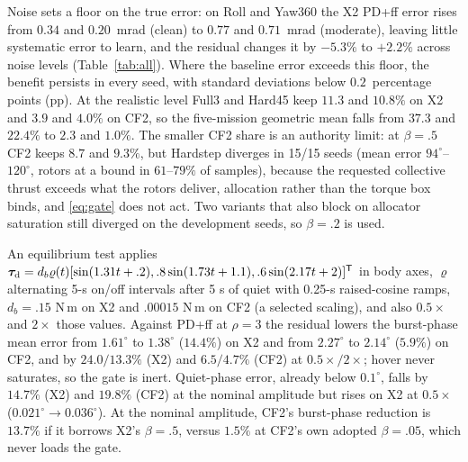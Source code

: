 \documentclass[letterpaper, 10 pt, conference]{ieeeconf}
\newcommand{\T}{^{\mathsf T}}
\begin{document}
Noise sets a floor on the true error: on Roll and Yaw360 the X2 PD+ff error rises from $0.34$ and $0.20$~mrad (clean) to $0.77$ and $0.71$~mrad (moderate), leaving little systematic error to learn, and the residual changes it by $-5.3\%$ to $+2.2\%$ across noise levels (Table~\ref{tab:all}). Where the baseline error exceeds this floor, the benefit persists in every seed, with standard deviations below $0.2$~percentage points (pp). At the realistic level Full3 and Hard45 keep $11.3$ and $10.8\%$ on X2 and $3.9$ and $4.0\%$ on CF2, so the five-mission geometric mean falls from $37.3$ and $22.4\%$ to $2.3$ and $1.0\%$. The smaller CF2 share is an authority limit: at $\beta=.5$ CF2 keeps $8.7$ and $9.3\%$, but Hardstep diverges in 15/15 seeds (mean error $94^\circ$--$120^\circ$, rotors at a bound in $61$--$79\%$ of samples), because the requested collective thrust exceeds what the rotors deliver, allocation rather than the torque box binds, and \eqref{eq:gate} does not act. Two variants that also block on allocator saturation still diverged on the development seeds, so $\beta=.2$ is used.

\label{sec:disturbance}

An equilibrium test applies $\bm\tau_{\rm d}=d_b\varrho(t)[\sin(1.31t+.2),\allowbreak .8\sin(1.73t+1.1),\allowbreak.6\sin(2.17t+2)]\T$ in body axes, $\varrho$ alternating 5-s on/off intervals after 5 s of quiet with 0.25-s raised-cosine ramps, $d_b=.15$ N\,m on X2 and $.00015$ N\,m on CF2 (a selected scaling), and also $0.5\times$ and $2\times$ those values. Against PD+ff at $\rho=3$ the residual lowers the burst-phase mean error from $1.61^\circ$ to $1.38^\circ$ ($14.4\%$) on X2 and from $2.27^\circ$ to $2.14^\circ$ ($5.9\%$) on CF2, and by $24.0/13.3\%$ (X2) and $6.5/4.7\%$ (CF2) at $0.5\times/2\times$; hover never saturates, so the gate is inert. Quiet-phase error, already below $0.1^\circ$, falls by $14.7\%$ (X2) and $19.8\%$ (CF2) at the nominal amplitude but rises on X2 at $0.5\times$ ($0.021^\circ\to0.036^\circ$). At the nominal amplitude, CF2's burst-phase reduction is $13.7\%$ if it borrows X2's $\beta=.5$, versus $1.5\%$ at CF2's own adopted $\beta=.05$, which never loads the gate.

\end{document}
